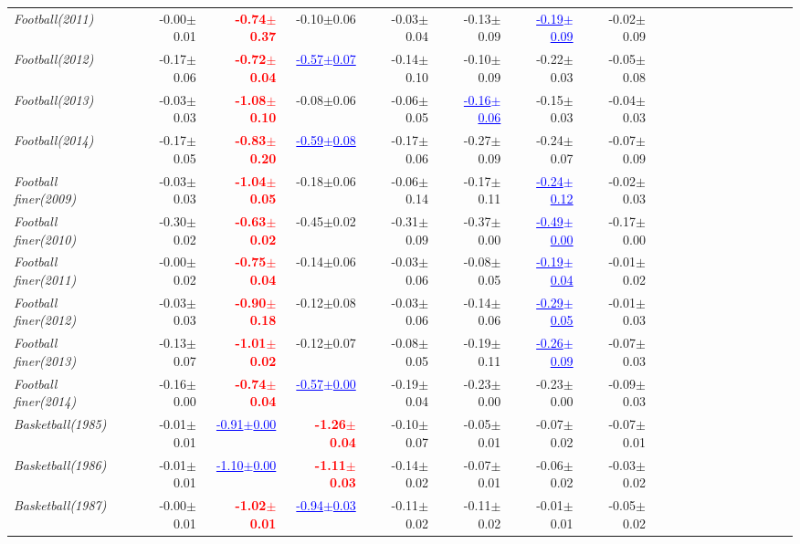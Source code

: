 \documentclass[nohyperref]{article}
\theoremstyle{plain}
\theoremstyle{definition}
\theoremstyle{remark}
\newcommand{\red}[1]{\textcolor{red}{\textbf{#1}}}
\newcommand{\blue}[1]{\textcolor{blue}{\underline{#1}}}
\begin{document}
\begin{table*}[!ht]
{\begin{tabular}{lrrrrrrrrrrrrrrrrrr}
			{\it Football(2011)} & -0.00$\pm$0.01 & \red{-0.74$\pm$0.37} & -0.10$\pm$0.06 & -0.03$\pm$0.04 & -0.13$\pm$0.09 & \blue{-0.19$\pm$0.09} & -0.02$\pm$0.09 \\
			{\it Football(2012)} & -0.17$\pm$0.06 & \red{-0.72$\pm$0.04} & \blue{-0.57$\pm$0.07} & -0.14$\pm$0.10 & -0.10$\pm$0.09 & -0.22$\pm$0.03 & -0.05$\pm$0.08 \\
			{\it Football(2013)} & -0.03$\pm$0.03 & \red{-1.08$\pm$0.10} & -0.08$\pm$0.06 & -0.06$\pm$0.05 & \blue{-0.16$\pm$0.06} & -0.15$\pm$0.03 & -0.04$\pm$0.03 \\
			{\it Football(2014)} & -0.17$\pm$0.05 & \red{-0.83$\pm$0.20} & \blue{-0.59$\pm$0.08} & -0.17$\pm$0.06 & -0.27$\pm$0.09 & -0.24$\pm$0.07 & -0.07$\pm$0.09 \\
			{\it Football finer(2009)} & -0.03$\pm$0.03 & \red{-1.04$\pm$0.05} & -0.18$\pm$0.06 & -0.06$\pm$0.14 & -0.17$\pm$0.11 & \blue{-0.24$\pm$0.12} & -0.02$\pm$0.03 \\
			{\it Football finer(2010)} & -0.30$\pm$0.02 & \red{-0.63$\pm$0.02} & -0.45$\pm$0.02 & -0.31$\pm$0.09 & -0.37$\pm$0.00 & \blue{-0.49$\pm$0.00} & -0.17$\pm$0.00 \\
			{\it Football finer(2011)} & -0.00$\pm$0.02 & \red{-0.75$\pm$0.04} & -0.14$\pm$0.06 & -0.03$\pm$0.06 & -0.08$\pm$0.05 & \blue{-0.19$\pm$0.04} & -0.01$\pm$0.02 \\
			{\it Football finer(2012)} & -0.03$\pm$0.03 & \red{-0.90$\pm$0.18} & -0.12$\pm$0.08 & -0.03$\pm$0.06 & -0.14$\pm$0.06 & \blue{-0.29$\pm$0.05} & -0.01$\pm$0.03 \\
			{\it Football finer(2013)} & -0.13$\pm$0.07 & \red{-1.01$\pm$0.02} & -0.12$\pm$0.07 & -0.08$\pm$0.05 & -0.19$\pm$0.11 & \blue{-0.26$\pm$0.09} & -0.07$\pm$0.03 \\
			{\it Football finer(2014)} & -0.16$\pm$0.00 & \red{-0.74$\pm$0.04} & \blue{-0.57$\pm$0.00} & -0.19$\pm$0.04 & -0.23$\pm$0.00 & -0.23$\pm$0.00 & -0.09$\pm$0.03 \\
			{\it Basketball(1985)} & -0.01$\pm$0.01 & \blue{-0.91$\pm$0.00} & \red{-1.26$\pm$0.04} & -0.10$\pm$0.07 & -0.05$\pm$0.01 & -0.07$\pm$0.02 & -0.07$\pm$0.01 \\
			{\it Basketball(1986)} & -0.01$\pm$0.01 & \blue{-1.10$\pm$0.00} & \red{-1.11$\pm$0.03} & -0.14$\pm$0.02 & -0.07$\pm$0.01 & -0.06$\pm$0.02 & -0.03$\pm$0.02 \\
			{\it Basketball(1987)} & -0.00$\pm$0.01 & \red{-1.02$\pm$0.01} & \blue{-0.94$\pm$0.03} & -0.11$\pm$0.02 & -0.11$\pm$0.02 & -0.01$\pm$0.01 & -0.05$\pm$0.02 \\

\end{tabular}}
\end{table*}
\end{document}
